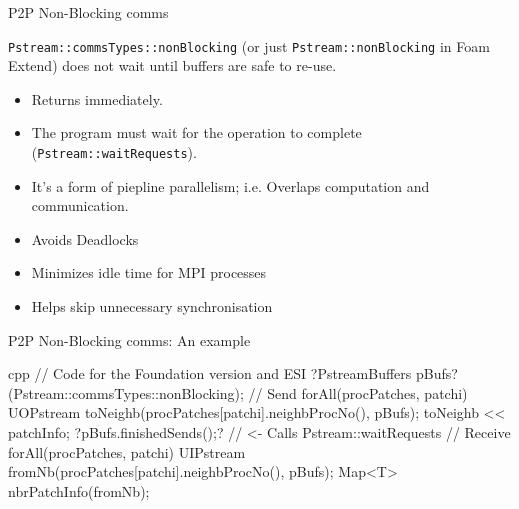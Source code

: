 \begin{frame}[fragile]{P2P Non-Blocking comms}

    {\tt Pstream::commsTypes::nonBlocking} (or just {\tt Pstream::nonBlocking} in Foam Extend) 
    does not wait until buffers are safe to re-use.
    \begin{itemize}
        \item Returns immediately.
        \item The program must wait for the operation to complete ({\tt Pstream::waitRequests}).
        \item It's a form of piepline parallelism; i.e. Overlaps computation and communication.
    \end{itemize}

    \begin{itemize}
        \item Avoids Deadlocks
        \item Minimizes idle time for MPI processes
        \item Helps skip unnecessary synchronisation
    \end{itemize}
\end{frame}

\begin{frame}[fragile]{P2P Non-Blocking comms: An example}
\begin{CodeEnvNoComment}{cpp}{\scriptsize}
// Code for the Foundation version and ESI
?\colorbox{mLightGreen!20}{PstreamBuffers pBufs}?(Pstream::commsTypes::nonBlocking);
// Send
forAll(procPatches, patchi)
{
  UOPstream toNeighb(procPatches[patchi].neighbProcNo(), pBufs);
  toNeighb << patchInfo;
}
?\colorbox{mLightGreen!20}{pBufs.finishedSends();}? // <- Calls Pstream::waitRequests
// Receive
forAll(procPatches, patchi)
{
  UIPstream fromNb(procPatches[patchi].neighbProcNo(), pBufs);
  Map<T> nbrPatchInfo(fromNb);
}
\end{CodeEnvNoComment}
\end{frame}

\pgfplotsset{width=7cm,compat=newest}

